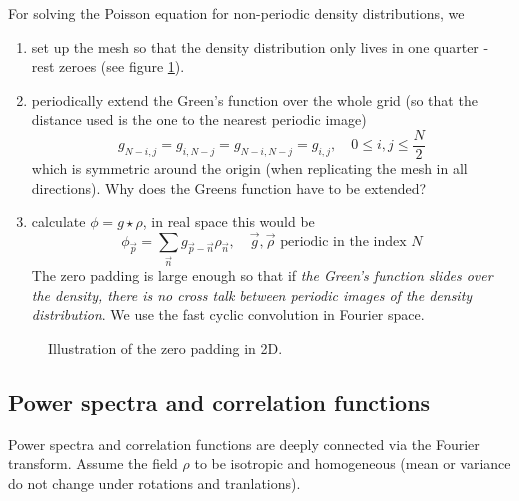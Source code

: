 For solving the Poisson equation for non-periodic density distributions, we
\begin{enumerate}
    \item set up the mesh so that the density distribution only lives in one quarter - rest zeroes (see figure \ref{fig:zero_padding_2D}).
    \item periodically extend the Green's function over the whole grid (so that the distance used is the one to the nearest periodic image)
    \begin{equation}
        g_{N-i,j} = g_{i,N-j} = g_{N-i,N-j} = g_{i,j}, \quad 0 \leq i,j \leq \frac{N}{2}
    \end{equation}
    which is symmetric around the origin (when replicating the mesh in all directions). \textcolor{red1}{Why does the Greens function have to be extended?}
    \item calculate $\phi = g \star \rho$, in real space this would be
    \begin{equation}
        \phi_\vec{p} = \sum_{\vec{n}} g_{\vec{p}-\vec{n}} \rho_\vec{n}, \quad \vec{g}, \vec{\rho} \text{ periodic in the index } N
    \end{equation}
    The zero padding is large enough so that if \textit{the Green's function slides over the density, there is no cross talk between periodic images of the density distribution}.
    We use the fast cyclic convolution in Fourier space.
\end{enumerate}

\begin{figure}[ht]
    \centering
    
    \caption{Illustration of the zero padding in 2D.}
    \label{fig:zero_padding_2D}
\end{figure}

\subsection{Power spectra and correlation functions}
Power spectra and correlation functions are deeply connected via the Fourier transform.
\textcolor{blue1}{Assume the field $\rho$ to be isotropic and homogeneous (mean or variance do not change under rotations and tranlations).}

